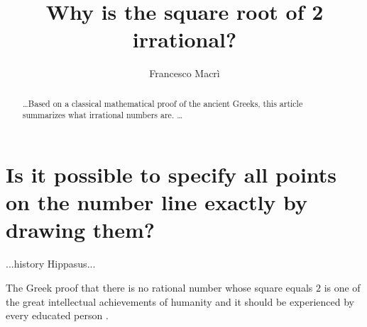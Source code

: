 \documentclass[11pt]{amsart}
\theoremstyle{definition}
\begin{document}
\title{Why is the square root of 2 irrational?}
\author{Francesco Macrì }
\begin{abstract}
    \dots Based on a classical mathematical proof of the ancient Greeks, this article summarizes what irrational numbers are. \dots
\end{abstract}
\maketitle
\section{Is it possible to specify all points on the number line exactly by drawing them?}
...history Hippasus...

The Greek proof that there is no rational number whose square equals \(2\) is one of the great intellectual achievements of humanity and it should be experienced by every educated person \cite[4]{axlerAlgebraTrigonometryStudent2012}.
\end{document}
